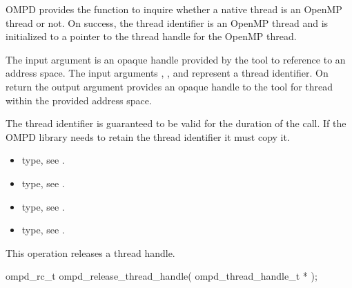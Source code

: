 \descr
OMPD provides the function 
to inquire whether a native thread is an OpenMP
thread or not.
On success, the thread identifier is an OpenMP thread and 
is initialized to a pointer to the thread handle for the OpenMP thread.

\argdesc


The input argument  is an opaque handle provided by the tool
to reference to an address space.
The input arguments ,  , and  represent a
thread identifier. 
On return the output argument  provides an opaque handle to the
tool for thread within the provided address space.

The thread identifier  is guaranteed to be valid for the duration of the call. If the 
OMPD library needs to retain the thread identifier it must copy it.





\crossreferences
\begin{itemize}
	\item {} type, see .
	\item {} type, see .
	\item {} type, see .
	\item {} type, see .
\end{itemize}

\label{ompd:ompd_release_thread_handle}
\summary
This operation releases a thread handle.

\format

\begin{cspecific}
\begin{ompSyntax}
ompd_rc_t ompd_release_thread_handle(
  ompd_thread_handle_t *
);
\end{ompSyntax}
\end{cspecific}


